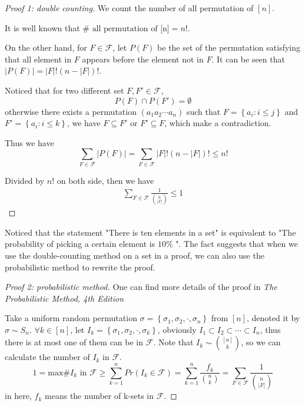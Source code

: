 \documentclass{article}
\theoremstyle{definition}
\begin{document}
\begin{proof}[Proof 1: double counting]
    We count the number of all permutation of $[n]$.
    
    It is well known that $\#\text{ all permutation of [n]} = n !$. 
    
    On the other hand, for $F \in \mathcal{F}$, let $P(F)$ be 
    the set of the permutation satisfying that all element in 
    $F$ appears before the element not in $F$. It can be seen 
    that 
    $ \left | P(F) \right | = \left | F \right | ! ( n - \left | F \right |) ! $.
    
    Noticed that for two different set $F,F' \in \mathcal{F}$,
    $$P(F) \cap P(F') = \emptyset $$
    otherwise there exists a permutation  
    $(a_1a_2\cdots a_n)$ such that $F=\left \{ a_i:i\le j \right \} $ and $F'=\left \{ a_i:i\le k \right \} $,
    we have $F \subseteq F'$ or $F' \subseteq F$, which make a contradiction.
    
    Thus we have $$\sum_{F \in \mathcal{F}}\left | P(F) \right | = \sum_{F \in \mathcal{F}}\left | F \right | !(n-\left | F \right | )!\le n!$$
    
    Divided by $n!$ on both side, then we have 
    \begin{align*}
        \sum_{F\in \mathcal{F}}\frac{1}{\binom{n}{|F|}}\le 1
    \end{align*}
\end{proof}

Noticed that the statement "There is ten elements in a set" is equivalent to "The probability of picking a certain element is $10\%$ ". 
The fact suggests that when we use the double-counting method on a set in a proof, we can also use the probabilistic method to rewrite the proof.

\begin{proof}[Proof 2: probabilistic method]
  One can find more details of the proof in \textit{The Probabilistic Method, 4th Edition}\cite{TheProbabilisticMethod}
  
  Take a uniform random permutation $\sigma=\left \{ \sigma_1,\sigma_2,\cdot,\sigma_n \right \}$ from $[n]$, denoted it by $\sigma \sim S_n $. 
  $\forall k \in [n]$, let $I_k=\left \{ \sigma_1,\sigma_2,\cdot,\sigma_k \right \} $, obviously 
  $I_1 \subset I_2 \subset \cdots \subset I_n $, thus there is at most one of them can be in $\mathcal{F}$.
  Note that $I_k \sim \binom{[n]}{k}$, so we can calculate the number of $I_k$ in $\mathcal{F}$.
  $$1 =\text{max} \#I_k \text{ in } \mathcal{F} \ge \sum_{k=1}^{n}Pr(I_k \in \mathcal{F}) = \sum_{k=1}^{n}\frac{f_k}{\binom{n}{k}}
  = \sum_{F\in \mathcal{F}}\frac{1}{\binom{n}{\left | F \right |    }}$$ in here, $f_k$ means the number of k-sets in $\mathcal{F}$.
\end{proof}
\end{document}
